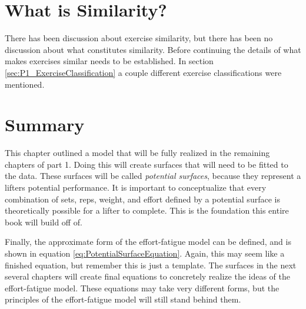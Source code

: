 

\section{What is Similarity?}
\label{sec:P2C1_WhatIsSimilarity}

There has been discussion about exercise similarity, but there has been no discussion about what constitutes similarity. Before continuing the details of what makes exercises similar needs to be established. In section \ref{sec:P1_ExerciseClassification} a couple different exercise classifications were mentioned.






\section{Summary}

This chapter outlined a model that will be fully realized in the remaining chapters of part 1. Doing this will create surfaces that will need to be fitted to the data. These surfaces will be called \textit{potential surfaces}, because they represent a lifters potential performance. It is important to conceptualize that every combination of sets, reps, weight, and effort defined by a potential surface is theoretically possible for a lifter to complete. This is the foundation this entire book will build off of.

Finally, the approximate form of the effort-fatigue model can be defined, and is shown in equation \ref{eq:PotentialSurfaceEquation}. Again, this may seem like a finished equation, but remember this is just a template. The surfaces in the next several chapters will create final equations to concretely realize the ideas of the effort-fatigue model. These equations may take very different forms, but the principles of the effort-fatigue model will still stand behind them.

